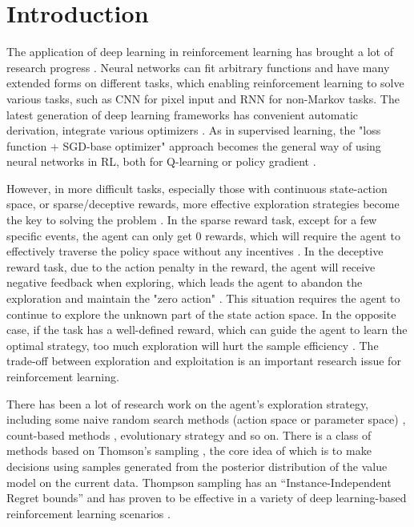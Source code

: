 \section{Introduction}
The application of deep learning in reinforcement learning has brought a lot of research progress \cite{DQN,AlphaGO,OpenAIdota}. Neural networks can fit arbitrary functions and have many extended forms on different tasks, which enabling reinforcement learning to solve various tasks, such as CNN for pixel input and RNN for non-Markov tasks\cite{DQN,RN395}. The latest generation of deep learning frameworks has convenient automatic derivation, integrate various optimizers \cite{PyTorch,MXNet,TF}. As in supervised learning, the "loss function + SGD-base optimizer" approach becomes the general way of using neural networks in RL, both for Q-learning or policy gradient \cite{DDPG,DQN,PPO}.

However, in more difficult tasks, especially those with continuous state-action space, or sparse/deceptive rewards, more effective exploration strategies become the key to solving the problem \cite{pnoise,colas2018gep}. In the sparse reward task, except for a few specific events, the agent can only get 0 rewards, which will require the agent to effectively traverse the policy space without any incentives \cite{VIME}. In the deceptive reward task, due to the action penalty in the reward, the agent will receive negative feedback when exploring, which leads the agent to abandon the exploration and maintain the "zero action" \cite{lehman2011abandoning,conti2018improving}. This situation requires the agent to continue to explore the unknown part of the state action space. In the opposite case, if the task has a well-defined reward, which can guide the agent to learn the optimal strategy, too much exploration will hurt the sample efficiency \cite{Showdown}. The trade-off between exploration and exploitation is an important research issue for reinforcement learning.

There has been a lot of research work on the agent's exploration strategy, including some naive random search methods (action space or parameter space) \cite{pnoise,DDPG}, count-based methods \cite{count1,count2}, evolutionary strategy \cite{EPGRL,ERL2} and so on. There is a class of methods based on Thomson's sampling \cite{TS}, the core idea of which is to make decisions using samples generated from the posterior distribution of the value model on the current data. Thompson sampling has an “Instance-Independent Regret bounds” \cite{TStutorial} and has proven to be effective in a variety of deep learning-based reinforcement learning scenarios \cite{BDQN,VIME,dropoutInference,lastLayerBayes}.

